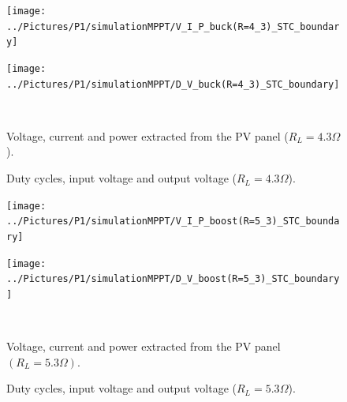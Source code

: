 \begin{figure}[H]

	\begin{minipage}[c]{0.5\textwidth}
		\centering
		\texttt{[image: ../Pictures/P1/simulationMPPT/V\_I\_P\_buck(R=4\_3)\_STC\_boundary]} %
	\end{minipage}%
	\hfill
	\begin{minipage}[c]{0.5\textwidth}
		\centering
		\texttt{[image: ../Pictures/P1/simulationMPPT/D\_V\_buck(R=4\_3)\_STC\_boundary]} %
	\end{minipage} \\ %
	\begin{minipage}[t]{0.45\textwidth}
		\caption{Voltage, current and power extracted from the PV panel ($R_{L}=4.3\Omega$).} %
		\label{buckboundary1}
	\end{minipage}%
	\hfill
	\begin{minipage}[t]{0.45\textwidth}
		\caption{Duty cycles, input voltage and output voltage ($R_{L}=4.3\Omega$).} %
		\label{buckboundary2}
	\end{minipage}
\end{figure}


\vspace{0.2cm}
\begin{figure}[H]
	\begin{minipage}[c]{0.5\textwidth}
		\centering
		\texttt{[image: ../Pictures/P1/simulationMPPT/V\_I\_P\_boost(R=5\_3)\_STC\_boundary]} %
	\end{minipage}%
	\hfill
	\begin{minipage}[c]{0.5\textwidth}
		\centering
		\texttt{[image: ../Pictures/P1/simulationMPPT/D\_V\_boost(R=5\_3)\_STC\_boundary]} %
	\end{minipage} \\ %
	\begin{minipage}[t]{0.45\textwidth}
		\caption{Voltage, current and power extracted from the PV panel $(R_{L}=5.3\Omega)$.} %
		\label{boostboundary1}
	\end{minipage}%
	\hfill
	\begin{minipage}[t]{0.45\textwidth}
		\caption{Duty cycles, input voltage and output voltage ($R_{L}=5.3\Omega$).} %
		\label{boostboundary2}
	\end{minipage}
\end{figure}


